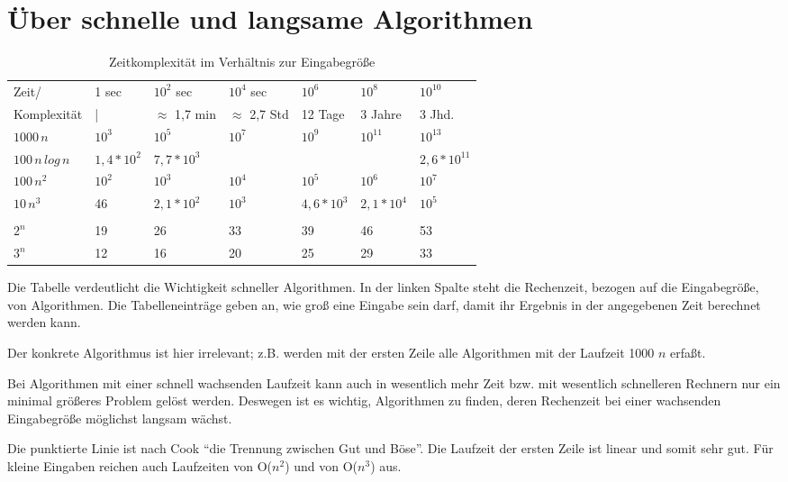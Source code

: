 \documentclass{scrreprt}%
\theoremstyle{break}
\begin{document}
\section{Über schnelle und langsame Algorithmen}
\begin{table}[h]
  \begin{tabular}{*{7}{|l}|}
    \hline
    Zeit/ & 1 sec & $10^2$ sec & $10^4$ sec & $10^6$ & $10^8$ & $10^{10}$ \\
    Komplexität & | & $\approx$ 1,7 min & $\approx$ 2,7 Std & 12 Tage & 3 Jahre & 3 Jhd.\\
    \hline
    $1000 \, n$ & $10^3$ & $10^5$ & $10^7$ & $10^9$ & $10^{11}$ & $10^{13}$ \\
    $100 \, n \, log \, n$ & $1,4*10^2$ & $7,7*10^3$ & & & & $2,6*10^{11}$ \\
    $100 \, n^2$ & $10^2$ & $10^3$ & $10^4$ & $10^5$ & $10^6$ & $10^7$\\
    $10 \, n^3$ & 46 & $2,1*10^2$ & $10^3$ & $4,6*10^3$ & $2,1*10^4$ & $10^5$ \\
    \\
    $2^n$ & 19 & 26 & 33 & 39 & 46 & 53\\
    $3^n$ & 12 & 16 & 20 & 25 & 29 & 33\\
    \hline
  \end{tabular}
  \caption{Zeitkomplexität im Verhältnis zur Eingabegröße}
\end{table}

Die Tabelle verdeutlicht die Wichtigkeit schneller Algorithmen. 
In der linken Spalte steht die Rechenzeit, bezogen auf die Eingabegröße, von Algorithmen. 
Die Tabelleneinträge geben an, wie groß eine Eingabe sein darf, damit ihr Ergebnis in der angegebenen Zeit berechnet werden kann. 

Der konkrete Algorithmus ist hier irrelevant; z.B. werden mit der ersten Zeile alle Algorithmen mit der Laufzeit 1000 $n$ erfaßt. 

Bei Algorithmen mit einer schnell wachsenden Laufzeit kann auch in wesentlich mehr Zeit bzw. mit wesentlich schnelleren Rechnern nur ein
minimal größeres Problem gelöst werden. Deswegen ist es wichtig, Algorithmen zu finden, deren Rechenzeit bei einer wachsenden
Eingabegröße möglichst langsam wächst.

Die punktierte Linie ist nach Cook "`die Trennung zwischen Gut und
Böse"'. Die Laufzeit der ersten Zeile ist linear und somit sehr gut.
Für kleine Eingaben reichen auch Laufzeiten von O($n^2$) und von O($n^3$) aus.
\end{document}

